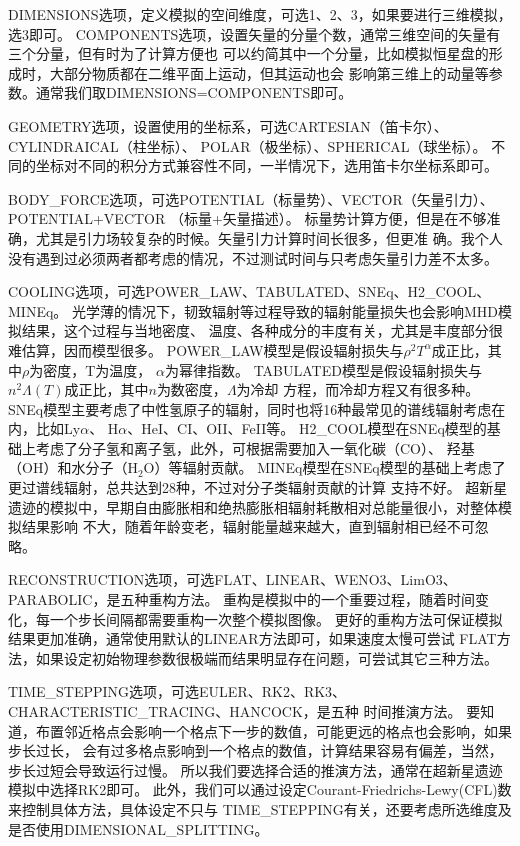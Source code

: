 DIMENSIONS选项，定义模拟的空间维度，可选1、2、3，如果要进行三维模拟，选3即可。
COMPONENTS选项，设置矢量的分量个数，通常三维空间的矢量有三个分量，但有时为了计算方便也
可以约简其中一个分量，比如模拟恒星盘的形成时，大部分物质都在二维平面上运动，但其运动也会
影响第三维上的动量等参数。通常我们取DIMENSIONS=COMPONENTS即可。

GEOMETRY选项，设置使用的坐标系，可选CARTESIAN（笛卡尔）、CYLINDRAICAL（柱坐标）、
POLAR（极坐标）、SPHERICAL（球坐标）。
不同的坐标对不同的积分方式兼容性不同，一半情况下，选用笛卡尔坐标系即可。

BODY\_FORCE选项，可选POTENTIAL（标量势）、VECTOR（矢量引力）、POTENTIAL+VECTOR
（标量+矢量描述）。
标量势计算方便，但是在不够准确，尤其是引力场较复杂的时候。矢量引力计算时间长很多，但更准
确。我个人没有遇到过必须两者都考虑的情况，不过测试时间与只考虑矢量引力差不太多。

COOLING选项，可选POWER\_LAW、TABULATED、SNEq、H2\_COOL、MINEq。
光学薄的情况下，韧致辐射等过程导致的辐射能量损失也会影响MHD模拟结果，这个过程与当地密度、
温度、各种成分的丰度有关，尤其是丰度部分很难估算，因而模型很多。
POWER\_LAW模型是假设辐射损失与$\rho^2T^{\alpha}$成正比，其中$\rho$为密度，T为温度，
$\alpha$为幂律指数。
TABULATED模型是假设辐射损失与$n^2\Lambda(T)$成正比，其中$n$为数密度，$\Lambda$为冷却
方程，而冷却方程又有很多种\citep{2017RMxAA..53..385F}。
SNEq模型主要考虑了中性氢原子的辐射，同时也将16种最常见的谱线辐射考虑在内，比如Ly$\alpha$、
H$\alpha$、HeI、CI、OII、FeII等。
H2\_COOL模型在SNEq模型的基础上考虑了分子氢和离子氢，此外，可根据需要加入一氧化碳（CO）、
羟基（OH）和水分子（H$_2$O）等辐射贡献。
MINEq模型在SNEq模型的基础上考虑了更过谱线辐射，总共达到28种，不过对分子类辐射贡献的计算
支持不好。
超新星遗迹的模拟中，早期自由膨胀相和绝热膨胀相辐射耗散相对总能量很小，对整体模拟结果影响
不大，随着年龄变老，辐射能量越来越大，直到辐射相已经不可忽略。

RECONSTRUCTION选项，可选FLAT、LINEAR、WENO3、LimO3、PARABOLIC，是五种重构方法。
重构是模拟中的一个重要过程，随着时间变化，每一个步长间隔都需要重构一次整个模拟图像。
更好的重构方法可保证模拟结果更加准确，通常使用默认的LINEAR方法即可，如果速度太慢可尝试
FLAT方法，如果设定初始物理参数很极端而结果明显存在问题，可尝试其它三种方法。

TIME\_STEPPING选项，可选EULER、RK2、RK3、CHARACTERISTIC\_TRACING、HANCOCK，是五种
时间推演方法。
要知道，布置邻近格点会影响一个格点下一步的数值，可能更远的格点也会影响，如果步长过长，
会有过多格点影响到一个格点的数值，计算结果容易有偏差，当然，步长过短会导致运行过慢。
所以我们要选择合适的推演方法，通常在超新星遗迹模拟中选择RK2即可。
此外，我们可以通过设定Courant-Friedrichs-Lewy(CFL)数来控制具体方法，具体设定不只与
TIME\_STEPPING有关，还要考虑所选维度及是否使用DIMENSIONAL\_SPLITTING。

